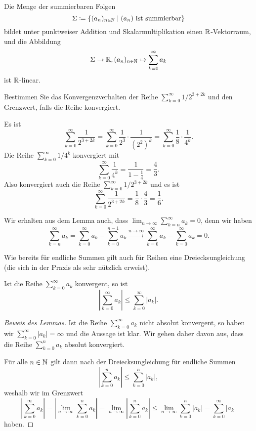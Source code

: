 \documentclass[a4paper,10pt]{article}
\begin{document}
\begin{kor}
 Die Menge der summierbaren Folgen
 \[
  \Sigma \coloneqq \{ (a_n)_{n \in \mathbb{N}} \mid \text{$(a_n)$ ist summierbar}\}
 \]
 bildet unter punktweiser Addition und Skalarmultiplikation einen $\mathbb{R}$-Vektorraum, und die Abbildung
 \[
  \Sigma \to \mathbb{R}, (a_n)_{n \in \mathbb{N}} \mapsto \sum_{k=0}^\infty a_k
 \]
 ist $\mathbb{R}$-linear.
\end{kor}


\begin{question}
 Bestimmen Sie das Konvergenzverhalten der Reihe $\sum_{k=0}^\infty 1/2^{3+2k}$ und den Grenzwert, falls die Reihe konvergiert.
\end{question}
\begin{solution}
 Es ist
 \[
  \sum_{k=0}^\infty \frac{1}{2^{3+2k}}
  = \sum_{k=0}^\infty \frac{1}{2^3} \cdot \frac{1}{(2^2)^k}
  = \sum_{k=0}^\infty \frac{1}{8} \cdot \frac{1}{4^k}.
 \] 
 Die Reihe $\sum_{k=0}^\infty 1/4^k$ konvergiert mit
 \[
  \sum_{k=0}^\infty \frac{1}{4^k}
  = \frac{1}{1-\frac{1}{4}}
  = \frac{4}{3}.
 \]
 Also konvergiert auch die Reihe $\sum_{k=0}^\infty 1/2^{3+2k}$ und es ist
 \[
  \sum_{k=0}^\infty \frac{1}{2^{3+2k}}
  = \frac{1}{8} \cdot \frac{4}{3}
  = \frac{1}{6}.
 \]
\end{solution}


Wir erhalten aus dem Lemma auch, dass $\lim_{n \to \infty} \sum_{k=n}^\infty a_k = 0$, denn wir haben
\[
 \sum_{k=n}^\infty a_k
 = \sum_{k=0}^\infty a_k - \sum_{k=0}^{n-1} a_k
 \xrightarrow{n \to \infty} \sum_{k=0}^\infty a_k - \sum_{k=0}^\infty a_k
 = 0.
\]


Wie bereits für endliche Summen gilt auch für Reihen eine Dreiecksungleichung (die sich in der Praxis als sehr nützlich erweist).


\begin{lem}
 Ist die Reihe $\sum_{k=0}^\infty a_k$ konvergent, so ist
 \[
  \left| \sum_{k=0}^\infty a_k \right| \leq \sum_{k=0}^\infty |a_k|.
 \]
\end{lem}
\begin{proof}[Beweis des Lemmas]
 Ist die Reihe $\sum_{k=0}^\infty a_k$ nicht absolut konvergent, so haben wir $\sum_{k=0}^\infty |a_k| = \infty$ und die Aussage ist klar. Wir gehen daher davon aus, dass die Reihe $\sum_{k=0}^n a_k$ absolut konvergiert.
 
 Für alle $n \in \mathbb{N}$ gilt dann nach der Dreiecksungleichung für endliche Summen
 \[
  \left| \sum_{k=0}^n a_k \right| \leq \sum_{k=0}^n |a_k|,
 \]
 weshalb wir im Grenzwert
 \[
  \left| \sum_{k=0}^\infty a_k \right|
  = \left| \lim_{n \to \infty} \sum_{k=0}^n a_k \right|
  = \lim_{n \to \infty} \left| \sum_{k=0}^n a_k \right|
  \leq \lim_{n \to \infty} \sum_{k=0}^n |a_k|
  = \sum_{k=0}^\infty |a_k|
 \]
 haben.
\end{proof}
\end{document}
